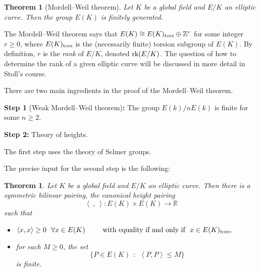 \documentclass[12pt]{amsart}
\numberwithin{equation}{section}
\newtheorem{theorem}[equation]{Theorem}
\theoremstyle{remark}
\theoremstyle{definition}
\theoremstyle{definition}
\theoremstyle{definition}
\theoremstyle{definition}
\theoremstyle{definition}
\theoremstyle{definition}
\theoremstyle{definition}
\begin{document}
\begin{theorem}[Mordell--Weil theorem]
Let $K$ be a global field and $E/K$ an elliptic curve. Then the group $E(K)$ is finitely generated.
\end{theorem}

The Mordell--Weil theorem says that $E(K)\cong E(K)_\textup{tors}\oplus \mathbb{Z}^r$ for some integer $r\geq 0$, where $E(K)_\textup{tors}$ is the (necessarily finite) torsion subgroup of $E(K)$. By definition, $r$ is the \textit{rank} of $E/K$, denoted $\textup{rk}(E/K)$. The question of how to determine the rank of a given elliptic curve will be discussed in more detail in Stoll's course. 

There are two main ingredients in the proof of the Mordell--Weil theorem.
\bigskip

\textbf{Step 1} (Weak Mordell--Weil theorem)\textbf{:} The group $E(k)/nE(k)$ is finite for some $n\geq 2$.

\bigskip

\textbf{Step 2:} Theory of heights.

\bigskip

The first step uses the theory of Selmer groups. 

The precise input for the second step is the following:

\begin{theorem}
Let $K$ be a global field and $E/K$ an elliptic curve. Then there is a symmetric bilinear pairing, the \emph{canonical height pairing} 
\[\left \langle ~,~\right \rangle :E(K)\times E(K)\rightarrow \mathbb{R}\]
such that
\begin{itemize}
\item[(i)] $\left\langle x,x \right \rangle \geq 0 ~~\forall x\in E(K) \phantom{hello}\textup{ with equality if and only if}~~x\in E(K)_\textup{tors},$\\
\item[(iii)] for each $M\geq 0$, the set 
\[\{P\in E(K)~~:~~\left \langle P,P\right \rangle \leq M\}\]
is finite.
\end{itemize}
\end{theorem}
\end{document}
